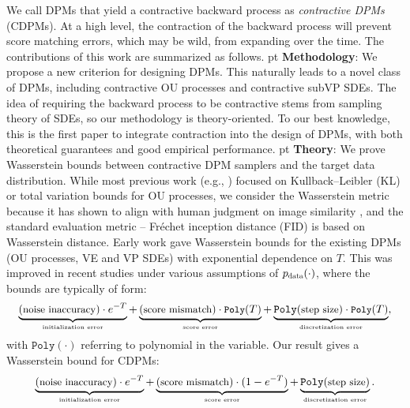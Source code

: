\documentclass[letterpaper,10pt,reqno]{amsart}
\numberwithin{equation}{section}
\begin{document}
\quad We call DPMs that yield a contractive backward process as {\em contractive DPMs} (CDPMs).
At a high level, 
the contraction of the backward process will prevent score matching errors,
which may be wild, from expanding over the time.
The contributions of this work are summarized as follows.
 pt
{\bf Methodology}:
We propose a new criterion for designing DPMs.
This naturally leads to a novel class of DPMs,
including contractive OU processes and contractive subVP SDEs.
The idea of requiring the backward process to be contractive
stems from sampling theory of SDEs,
so our methodology is theory-oriented. 
To our best knowledge, 
this is the first paper to integrate contraction into the design of DPMs,
with both theoretical guarantees
and good empirical performance.
 pt
{\bf Theory}:
We prove Wasserstein bounds between contractive DPM samplers
and the target data distribution.
While most previous work (e.g., \cite{Chen23, DV21, LLT22}) 
focused on Kullback–Leibler (KL) or total variation bounds for OU processes,
we consider the Wasserstein metric because  
it has shown to align with human judgment on image similarity \cite{Bor19}, and the standard evaluation metric -- Fr\'echet inception distance (FID) is based on Wasserstein distance.
Early work \cite{DV21, KW22} gave Wasserstein bounds for the existing DPMs (OU processes, VE and VP SDEs)
with exponential dependence on $T$.
This was improved in recent studies \cite{Chen23, LLT23, GNZ23}
under various assumptions of $p_{\scalebox{0.7}{data}}(\cdot)$, 
where the bounds are typically of form:
$$\underbrace{(\small \mbox{noise inaccuracy}) \cdot e^{-T}}_{\tiny \mbox{initialization error}} + \underbrace{(\small \mbox{score mismatch}) \cdot \texttt{Poly}(T)}_{\tiny \mbox{score error}}
+ \underbrace{\texttt{Poly}(\small \mbox{step size}) \cdot \texttt{Poly}(T)}_{\tiny \mbox{discretization error}},$$
with $\texttt{Poly}(\cdot)$ referring to polynomial in the variable. 
Our result gives a Wasserstein bound for CDPMs:
\begin{equation*}
\begin{aligned}
\underbrace{(\small \mbox{noise inaccuracy}) \cdot e^{-T}}_{\tiny \mbox{initialization error}}  + \underbrace{(\small \mbox{score mismatch}) \cdot (1 - e^{-T})}_{\tiny \mbox{score error}}
+ \underbrace{\texttt{Poly}(\small \mbox{step size})}_{\tiny \mbox{discretization error}}.
\end{aligned}
\end{equation*}
\end{document}
